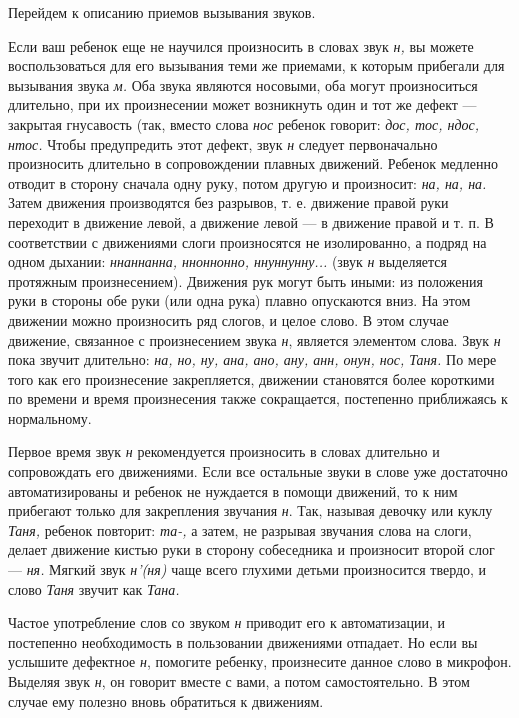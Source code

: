 \documentclass{book}
\renewcommand{\emph}[1]{\textit{#1}}
\begin{document}
Перейдем к описанию приемов вызывания звуков.

Если ваш ребенок еще не научился произносить в словах звук \emph{н,} вы
можете воспользоваться для его вызывания теми же приемами, к которым
прибегали для вызывания звука \emph{м.} Оба звука являются носовыми, оба
могут произноситься длительно, при их произнесении может возникнуть один
и тот же дефект --- закрытая гнусавость (так, вместо слова \emph{нос}
ребенок говорит: \emph{дос, тос, ндос, нтос.} Чтобы предупредить этот
дефект, звук \emph{н} следует первоначально произносить длительно в
сопровождении плавных движений. Ребенок медленно отводит в сторону
сначала одну руку, потом другую и произносит: \emph{на, на, на.} Затем
движения производятся без разрывов, т. е. движение правой руки переходит
в движение левой, а движение левой --- в движение правой и т. п. В
соответствии с движениями слоги произносятся не изолированно, а подряд
на одном дыхании: \emph{ннаннанна, нноннонно, ннуннунну...} (звук
\emph{н} выделяется протяжным произнесением). Движения рук могут быть
иными: из положения руки в стороны обе руки (или одна рука) плавно
опускаются вниз. На этом движении можно произносить ряд слогов, и целое
слово. В этом случае движение, связанное с произнесением звука \emph{н},
является элементом слова. Звук \emph{н} пока звучит длительно: \emph{на,
но, ну, ана, ано, ану, анн, онун, нос, Таня.} По мере того как его
произнесение закрепляется, движении становятся более короткими по
времени и время произнесения также сокращается, постепенно приближаясь к
нормальному.

Первое время звук \emph{н} рекомендуется произносить в словах длительно
и сопровождать его движениями. Если все остальные звуки в слове уже
достаточно автоматизированы и ребенок не нуждается в помощи движений, то
к ним прибегают только для закрепления звучания \emph{н}. Так, называя
девочку или куклу \emph{Таня,} ребенок повторит: \emph{та-,} а затем, не
разрывая звучания слова на слоги, делает движение кистью руки в сторону
собеседника и произносит второй слог --- \emph{ня.} Мягкий звук
\emph{н'(ня)} чаще всего глухими детьми произносится твердо, и слово
\emph{Таня} звучит как \emph{Тана.}

Частое употребление слов со звуком \emph{н} приводит его к
автоматизации, и постепенно необходимость в пользовании движениями
отпадает. Но если вы услышите дефектное \emph{н}, помогите ребенку,
произнесите данное слово в микрофон. Выделяя звук \emph{н}, он говорит
вместе с вами, а потом самостоятельно. В этом случае ему полезно вновь
обратиться к движениям.
\end{document}
